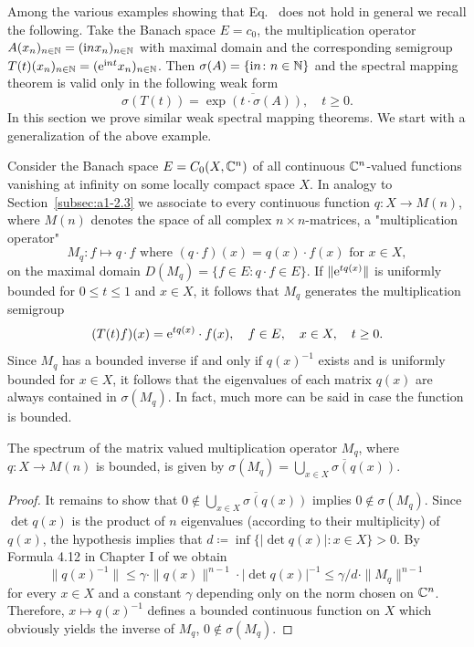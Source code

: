 Among the various examples showing that Eq.~ does not hold in general we recall the following.
Take the Banach space $E = c_{0}$, the multiplication operator $A(x_{n})_{n\in\mathbb{N}} = (\mathrm{i} n x_{n})_{n\in\mathbb{N}}$ with maximal domain and the corresponding semigroup $T(t)(x_{n})_{n \in \mathbb{N}} = 
(\mathrm{e}^{\mathrm{i} nt}x_{n})_{n \in \mathbb{N}}$.
Then $\sigma(A) = \{\mathrm{i} n \colon n \in \mathbb{N}\}$ and the spectral mapping theorem is valid only in the following weak form
\begin{equation}\label{eq:a3-7.2}
	\sigma(T(t)) = \overline{\exp(t\cdot\sigma(A))}, \quad t \geq 0 .
\end{equation}
In this section we prove similar weak spectral mapping theorems.
We start with a generalization of the above example.

Consider the Banach space $E = C_{0}(X,\mathbb{C}^{n})$ of all continuous $\mathbb{C}^{n}$-valued functions vanishing at infinity on some locally compact space $X$.
In analogy to Section~\ref{subsec:a1-2.3} we associate to every continuous function $q \colon X \to M(n)$, where $M(n)$ denotes the space of all complex $n\times n$-matrices, a "multiplication operator" 
\[
M_{q} \colon f \mapsto q\cdot f \text{ where } (q\cdot f)(x) = q(x)\cdot f(x) \text{ for } x \in X , 
\]
on the maximal domain $D(M_{q}) = \{f \in E \colon q\cdot f \in E\}$.
If\/ $\|\mathrm{e}^{tq(x)}\|$ is uniformly bounded for $0 \leq t \leq 1$ and $x \in X$, it follows that $M_{q}$ generates the multiplication semigroup
\[
	(T(t)f)(x) = \eu^{tq(x)}\cdot f(x), \quad f \in E, \quad x \in X, \quad t \geq 0 .
\]
Since $M_{q}$ has a bounded inverse if and only if\/ $q(x)^{-1}$ exists and is uniformly bounded for $x \in X$, it follows that the eigenvalues of each matrix $q(x)$ are always contained in $\sigma(M_{q})$.
In fact, much more can be said in case the function is bounded.
\begin{lemma}\label{lem:a3-7.1}
The spectrum of the matrix valued multiplication operator $M_{q}$, where $q \colon X \to M(n)$ is bounded, is given by $\sigma(M_{q}) = \overline{\bigcup_{x\in X} \sigma(q(x))}$. 
\end{lemma}
\begin{proof}
It remains to show that $0 \notin \overline{\bigcup_{x\in X} \sigma(q(x))}$ implies $0 \notin \sigma(M_{q})$.
Since $\det q(x)$ is the product of\/ $n$ eigenvalues (according to their multiplicity) of\/ $q(x)$, the hypothesis implies that $d \coloneq \inf\{|\det q(x)| \colon x \in X\} > 0$.
By Formula 4.12 in Chapter I of \textcite{kato:1976} we obtain
\[
\|q(x)^{-1}\| \leq \gamma \cdot \|q(x)\|^{n-1} \cdot |\det q(x)|^{-1} \leq \gamma/d \cdot \|M_{q}\|^{n-1}
\]
for every $x \in X$ and a constant $\gamma$ depending only on the norm chosen on $\mathbb{C}^{n}$.
Therefore, $x \mapsto q(x)^{-1}$ defines a bounded continuous function on $X$ which obviously yields the inverse of\/ $M_{q}$, \ie $0 \notin \sigma(M_{q})$.
\end{proof}
